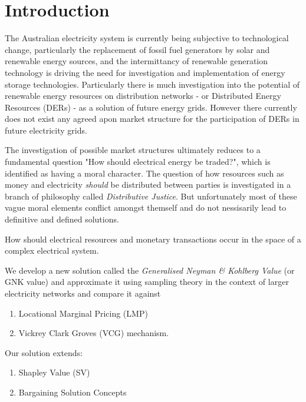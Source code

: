 \documentclass[
10pt, %
a4paper, %
oneside, %
headinclude,footinclude, %
BCOR5mm, %
]{scrartcl}
\begin{document}
\section{Introduction}

The Australian electricity system is currently being subjective to technological change, particularly the replacement of fossil fuel generators by solar and renewable energy sources, and the intermittancy of renewable generation technology is driving the need for investigation and implementation of energy storage technologies.
Particularly there is much investigation into the potential of renewable energy resources on distribution networks - or Distributed Energy Resources (DERs) - as a solution of future energy grids.
However there currently does not exist any agreed apon market structure for the participation of DERs in future electricity grids.

The investigation of possible market structures ultimately reduces to a fundamental question "How should electrical energy be traded?", which is identified as having a moral character.
The question of how resources such as money and electricity \textit{should} be distributed between parties is investigated in a branch of philosophy called \textit{Distributive Justice}.
But unfortunately most of these vague moral elements conflict amongst themself and do not nessisarily lead to definitive and defined solutions.

How should electrical resources and monetary transactions occur in the space of a complex electrical system.

We develop a new solution called the \textit{Generalised Neyman \& Kohlberg Value} (or GNK value) and approximate it using sampling theory in the context of larger electricity networks and compare it against
\begin{enumerate}[noitemsep]
\item Locational Marginal Pricing (LMP)
\item Vickrey Clark Groves (VCG) mechanism.
\end{enumerate}

Our solution extends:
\begin{enumerate}
\item Shapley Value (SV)
\item Bargaining Solution Concepts
\end{enumerate}
\end{document}
